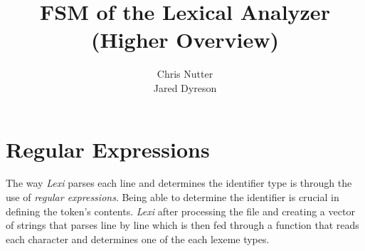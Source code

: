 \documentclass{article}
\title{FSM of the Lexical Analyzer (Higher Overview)}
\author{Chris Nutter \\
        Jared Dyreson}
\begin{document}
\maketitle
\tableofcontents

\newpage

\section{Regular Expressions}
    The way \emph{Lexi} parses each line and determines the identifier type is through the use of \emph{regular expressions}. Being able to determine the identifier is crucial in defining the token's contents. \emph{Lexi} after processing the file and creating a vector of strings that parses line by line which is then fed through a function that reads each character and determines one of the each lexeme types.
\end{document}
